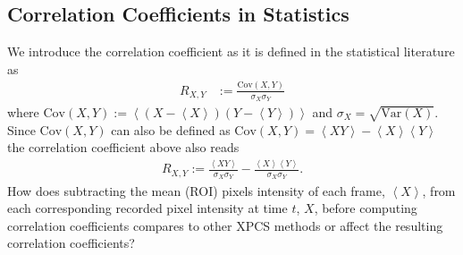\documentclass[11pt]{article}
\def\addMA#1{{\noindent\color{blue}{#1}}}
\theoremstyle{definition}
\begin{document}
\subsection{Correlation Coefficients in Statistics}
%
%
We introduce the correlation coefficient as it is defined in the statistical literature \cite[Sec. 27.8]{Kendall63_2a} as
%
\begin{align}
R_{X, Y} &:= \frac{\text{Cov}(X, Y)}{\sigma_X \sigma_Y} \label{eqn:Rxy1}
\end{align}
%
where $\text{Cov}(X,Y):= \left < (X - \left<X\right>) (Y- \left<Y\right>) \right>$ and $\sigma_X = \sqrt{\text{Var} (X)} 
$. 
%
Since $\text{Cov}(X,Y)$ can also be defined as $\text{Cov}(X,Y) = \left < X Y \right> - \left<X\right> \left<Y\right>$ the correlation coefficient above also reads 
%
\begin{align}\label{eqn:Rxy2}
R_{X,  Y} := \frac{\left < XY \right >}{\sigma_X \sigma_Y} - \frac{\left<X\right> \left<Y\right>}{\sigma_X \sigma_Y}.
\end{align}
%
% 
%
%
%
How does subtracting the mean (ROI) pixels intensity of each frame, \(\left<X\right>\), from each corresponding recorded pixel intensity at time $t$, \(X\), before computing correlation coefficients compares to other XPCS methods or affect the resulting correlation coefficients? \addMA{[Should we suppress this paragraph? (it cannot be understood without knowing that the mean of a exponential RV is equal to its STD, which is stated in the next section).]}
\end{document}
